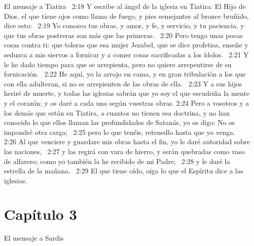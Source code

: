 El mensaje a Tiatira  
2:18 Y escribe al ángel de la iglesia en Tiatira: El Hijo de Dios, el que tiene ojos como llama de fuego, y pies semejantes al bronce bruñido, dice esto:  
2:19 Yo conozco tus obras, y amor, y fe, y servicio, y tu paciencia, y que tus obras postreras son más que las primeras.  
2:20 Pero tengo unas pocas cosas contra ti: que toleras que esa mujer Jezabel, que se dice profetisa, enseñe y seduzca a mis siervos a fornicar y a comer cosas sacrificadas a los ídolos.  
2:21 Y le he dado tiempo para que se arrepienta, pero no quiere arrepentirse de su fornicación.  
2:22 He aquí, yo la arrojo en cama, y en gran tribulación a los que con ella adulteran, si no se arrepienten de las obras de ella.  
2:23 Y a sus hijos heriré de muerte, y todas las iglesias sabrán que yo soy el que escudriña la mente y el corazón; y os daré a cada uno según vuestras obras. 
2:24 Pero a vosotros y a los demás que están en Tiatira, a cuantos no tienen esa doctrina, y no han conocido lo que ellos llaman las profundidades de Satanás, yo os digo: No os impondré otra carga;  
2:25 pero lo que tenéis, retenedlo hasta que yo venga.  
2:26 Al que venciere y guardare mis obras hasta el fin, yo le daré autoridad sobre las naciones,  
2:27 y las regirá con vara de hierro, y serán quebradas como vaso de alfarero; como yo también la he recibido de mi Padre;  
2:28 y le daré la estrella de la mañana.  
2:29 El que tiene oído, oiga lo que el Espíritu dice a las iglesias.  
\section*{Capítulo 3 }
El mensaje a Sardis  

